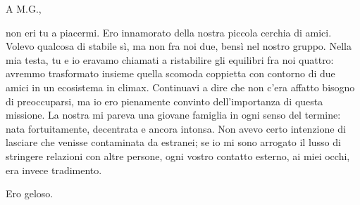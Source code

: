 \documentclass{letter}
\begin{document}
\begin{letter}{}
\opening{A M.G.,}
non eri tu a piacermi. Ero innamorato della nostra piccola cerchia di amici.
Volevo qualcosa di stabile sì, ma non fra noi due, bensì nel nostro gruppo.
Nella mia testa, tu e io eravamo chiamati a ristabilire gli equilibri fra noi
quattro: avremmo trasformato insieme quella scomoda coppietta con contorno di
due amici in un ecosistema in climax. Continuavi a dire che non c'era affatto
bisogno di preoccuparsi, ma io ero pienamente convinto dell'importanza di questa
missione. La nostra mi pareva una giovane famiglia in ogni senso del termine:
nata fortuitamente, decentrata e ancora intonsa. Non avevo certo intenzione di
lasciare che venisse contaminata da estranei; se io mi sono arrogato il lusso di
stringere relazioni con altre persone, ogni vostro contatto esterno, ai miei
occhi, era invece tradimento.
\closing{Ero geloso.}
\end{letter}
\end{document}
